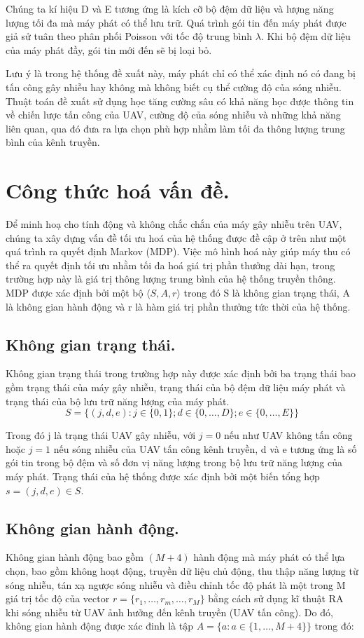 \documentclass{uetgraduation}
\begin{document}
Chúng ta kí hiệu D và E tương ứng là kích cỡ bộ đệm dữ liệu và lượng năng lượng tối đa mà máy phát có thể lưu trữ. Quá trình gói tin đến máy phát được giả sử tuân theo phân
phối Poisson với tốc độ trung bình $\lambda$. Khi bộ đệm dữ liệu của máy phát đầy, gói tin mới đến sẽ bị loại bỏ.

Lưu ý là trong hệ thống đề xuất này, máy phát chỉ có thể xác định nó có đang bị tấn công gây nhiễu hay không mà không biết cụ thể cường độ của sóng nhiễu. Thuật toán đề xuất sử dụng học tăng 
cường sâu có khả năng học được thông tin về chiến lược tấn công của UAV, cường độ của sóng nhiễu và những khả năng liên quan, qua đó đưa ra lựa chọn
phù hợp nhằm làm tối đa thông lượng trung bình của kênh truyền.


\section{Công thức hoá vấn đề.}
Để minh hoạ cho tính động và không chắc chắn của máy gây nhiễu trên UAV, chúng ta xây dựng vấn đề tối ưu hoá của hệ thống được đề cập ở trên như một quá trình ra quyết định
Markov (MDP). Việc mô hình hoá này giúp máy thu có thể ra quyết định tối ưu nhằm tối đa hoá giá trị phần thưởng dài hạn, trong trường hợp này là giá trị thông lượng trung bình
của hệ thống truyền thông. MDP được xác định bởi một bộ $\langle S, A, r \rangle$ trong đó S là không gian trạng thái, A là không gian hành động và r là hàm giá trị phần thưởng
tức thời của hệ thống.

\subsection{Không gian trạng thái.}
Không gian trạng thái trong trường hợp này được xác định bởi ba trạng thái bao gồm trạng thái của máy gây nhiễu, trạng thái của bộ đệm dữ liệu máy phát và trạng thái của bộ lưu
trữ năng lượng của máy phát.
\[
S = \{(j, d, e) : j \in \{0, 1\}; d \in \{0, \dots, D\}; e \in \{0, \dots, E\}\}
\]

Trong đó j là trạng thái UAV gây nhiễu, với $j = 0$ nếu như UAV không tấn công hoặc $j = 1$ nếu sóng nhiễu của UAV tấn công kênh truyền, d và e tương ứng là số gói tin trong bộ
đệm và số đơn vị năng lượng trong bộ lưu trữ năng lượng của máy phát. Trạng thái của hệ thống được xác định bởi một biến tổng hợp $s = (j, d, e) \in S$.

\subsection{Không gian hành động.}
Không gian hành động bao gồm $(M+4)$ hành động mà máy phát có thể lựa chọn, bao gồm không hoạt động, truyền dữ liệu chủ động, thu thập năng lượng từ sóng nhiễu, tán xạ ngược sóng
nhiễu và điều chỉnh tốc độ phát là một trong M giá trị tốc độ của vector $r = \{r_1, \dots, r_m,\dots, r_M\}$ bằng cách sử dụng kĩ thuật RA khi sóng nhiễu từ UAV ảnh hưởng đến
kênh truyền (UAV tấn công). Do đó, không gian hành động được xác đinh là tập $A = \{a : a \in \{1, \dots, M+4\}\}$ trong đó:
\end{document}
